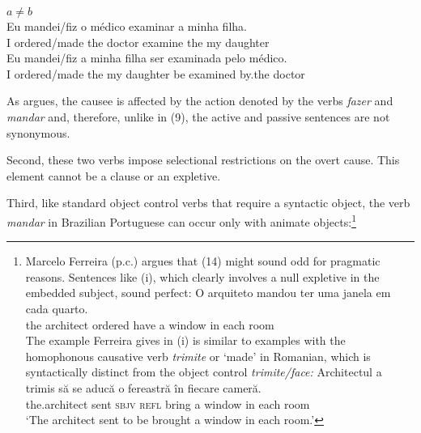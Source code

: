 \documentclass[output=paper]{langsci/langscibook}
\begin{document}
\ea%
           $a \neq b$\label{ex:moreno:10}\\
    \ea
    \gll Eu   mandei/fiz      o    médico   examinar  a    minha filha.\\
         I         ordered/made the doctor     examine    the my     daughter\\
    \ex  
    \gll Eu   mandei/fiz    a     minha filha      ser examinada pelo    médico.\\
         I         ordered/made the  my      daughter  be examined    by.the doctor\\
    \z
\z    

As \citet{Farrell1995} argues, the causee is affected by the action denoted by the verbs \textit{fazer} and \textit{mandar} and, therefore, unlike in (9), the active and passive sentences are not synonymous.

Second, these two verbs impose selectional restrictions on the overt cause. This element cannot be a clause or an expletive. 

    \z



\z

Third, like standard object control verbs that require a syntactic object, the verb \textit{mandar} in Brazilian Portuguese can occur only with animate objects:\footnote{Marcelo Ferreira (p.c.) argues that (14) might sound odd for pragmatic reasons. Sentences like (i), which clearly involves a null expletive in the~ embedded subject, sound perfect:
\ea \gll  O   arquiteto mandou   ter    uma janela    em cada quarto.\\
the architect  ordered   have a      window in  each  room\\
\z The example Ferreira gives in (i) is similar to examples with the homophonous causative verb \textit{trimite} or ‘made’ in Romanian, which is syntactically distinct from the object control \textit{trimite\slash face:}
\ea \gll Architectul   {a trimis} să     se    aducă       o fereastră în fiecare cameră.\\
         the.architect sent       \textsc{sbjv} \textsc{refl} bring a window   in each room\\
    \glt ‘The architect sent to be brought a window in each room.’
\z}
\end{document}
